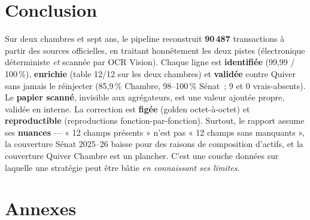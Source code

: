 \documentclass[11pt,a4paper]{article}
\begin{document}
\section{Conclusion}
Sur deux chambres et sept ans, le pipeline reconstruit \textbf{90\,487} transactions à partir des
sources officielles, en traitant honnêtement les deux pistes (électronique déterministe \emph{et}
scannée par OCR Vision). Chaque ligne est \textbf{identifiée} (99,99 / 100\,\%), \textbf{enrichie}
(table 12/12 sur les deux chambres) et \textbf{validée} contre Quiver sans jamais le réinjecter (85,9\,\%
Chambre, 98--100\,\% Sénat~; 9 et 0 vrais-absents). Le \textbf{papier scanné}, invisible aux
agrégateurs, est une valeur ajoutée propre, validée en interne. La correction est \textbf{figée}
(golden octet-à-octet) et \textbf{reproductible} (reproductions fonction-par-fonction). Surtout, le
rapport assume ses \textbf{nuances} — « 12 champs présents » n'est pas « 12 champs sans manquants », la
couverture Sénat 2025--26 baisse pour des raisons de composition d'actifs, et la couverture Quiver
Chambre est un plancher. C'est une couche données sur laquelle une stratégie peut être bâtie \emph{en
connaissant ses limites}.

\section{Annexes}
\end{document}
